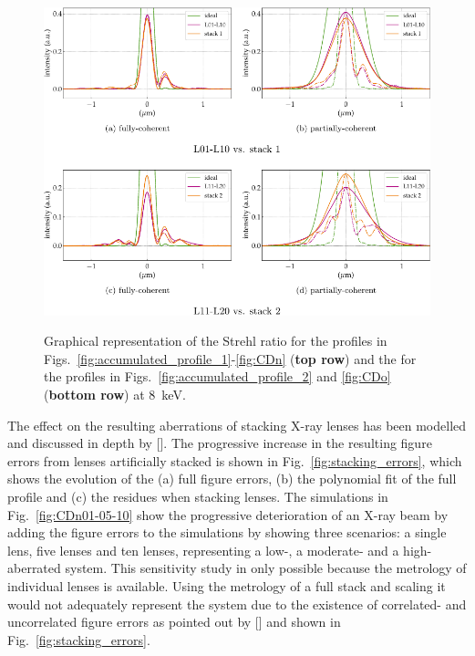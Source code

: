 \begin{refsection}
\begin{figure}[t]
    \centering
    {\includegraphics[width=0.7\linewidth]{figures/ch05/CD_Strehl.pdf}}
    \caption[Strehl ratio of L01-L10 vs. stack 1 and L11-L20 vs. stack 2 simulations]{Graphical representation of the Strehl ratio for the profiles in Figs.~\ref{fig:accumulated_profile_1}-\ref{fig:CDn} (\textbf{top row}) and the for the profiles in Figs.~\ref{fig:accumulated_profile_2} and \ref{fig:CDo} (\textbf{bottom row}) at 8~keV. }
    \label{fig:CD_Strehl}
\end{figure}

The effect on the resulting aberrations of stacking X-ray lenses has been modelled and discussed in depth by [\cite{Osterhoff2017}]. The progressive increase in the resulting figure errors from lenses artificially stacked is shown in Fig.~\ref{fig:stacking_errors}, which shows the evolution of the (a) full figure errors, (b) the polynomial fit of the full profile and (c) the residues when stacking lenses. The simulations in Fig.~\ref{fig:CDn01-05-10} show the progressive deterioration of an X-ray beam by adding the figure errors to the simulations by showing three scenarios: a single lens, five lenses and ten lenses, representing a low-, a moderate- and a high-aberrated system. This sensitivity study in only possible because the metrology of individual lenses is available. Using the metrology of a full stack and scaling it would not adequately represent the system due to the existence of correlated- and uncorrelated figure errors as pointed out by [\cite{Osterhoff2017}] and shown in Fig.~\ref{fig:stacking_errors}.



\end{refsection}
